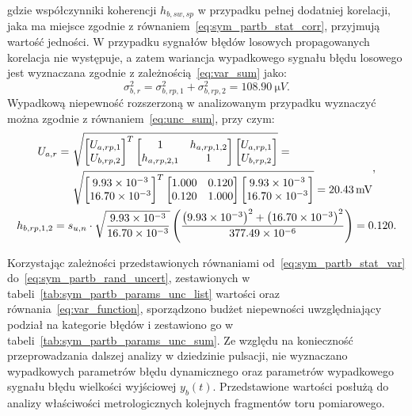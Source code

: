 gdzie współczynniki koherencji $h_{b,sw,sp}$ w przypadku pełnej dodatniej korelacji, jaka ma miejsce zgodnie z równaniem~\eqref{eq:sym_partb_stat_corr}, przyjmują wartość jedności. W przypadku sygnałów błędów losowych propagowanych korelacja nie występuje, a zatem wariancja wypadkowego sygnału błędu losowego jest wyznaczana zgodnie z zależnością~\eqref{eq:var_sum} jako:
\begin{equation}
\sigma_{b,r}^{2} = \sigma_{b,rp,1}^{2} + \sigma_{b,rp,2}^{2} = \qty{108.90}{\micro V} \label{eq:sym_partb_rand_var}.
\end{equation}
Wypadkową niepewność rozszerzoną w analizowanym przypadku wyznaczyć można zgodnie z równaniem~\eqref{eq:unc_sum}, przy czym:
\begin{gather}
\begin{split}
U_{a,r} = ~ & \sqrt{
\begin{bmatrix}
U_{a,rp,1} \\ U_{b,rp,2}
\end{bmatrix}^{T}
\begin{bmatrix}
1            & h_{a,rp,1,2} \\
h_{a,rp,2,1} & 1
\end{bmatrix}
\begin{bmatrix}
U_{a,rp,1} \\ U_{b,rp,2}
\end{bmatrix}} = ~ \\ & \sqrt{
\begin{bmatrix}
\num{9.93e-3} \\ \num{16.70e-3}
\end{bmatrix}^{T}
\begin{bmatrix}
1.000 & 0.120 \\
0.120 & 1.000
\end{bmatrix}
\begin{bmatrix}
\num{9.93e-3} \\ \num{16.70e-3}
\end{bmatrix}} = \qty{20.43}{mV}
\end{split}
\label{eq:sym_partb_rand_uncert}, \\
h_{b,rp,1,2} = s_{u,n} \cdot \sqrt{\frac{\num{9.93e-3}}{\num{16.70e-3}}} \left( \frac{\left(\num{9.93e-3}\right)^{2} + \left(\num{16.70e-3}\right)^{2}}{\num{377.49e-6}} \right) = 0.120 \label{eq:sym_partb_coher_rp_1_2}.
\end{gather}

Korzystając zależności przedstawionych równaniami od~\eqref{eq:sym_partb_stat_var} do~\eqref{eq:sym_partb_rand_uncert}, zestawionych w tabeli~\ref{tab:sym_partb_params_unc_list} wartości oraz równania~\eqref{eq:var_function}, sporządzono budżet niepewności uwzględniający podział na kategorie błędów i zestawiono go w tabeli~\ref{tab:sym_partb_params_unc_sum}. Ze względu na konieczność przeprowadzania dalszej analizy w dziedzinie pulsacji, nie wyznaczano wypadkowych parametrów błędu dynamicznego oraz parametrów wypadkowego sygnału błędu wielkości wyjściowej $y_{b}(t)$. Przedstawione wartości posłużą do analizy właściwości metrologicznych kolejnych fragmentów toru pomiarowego.


